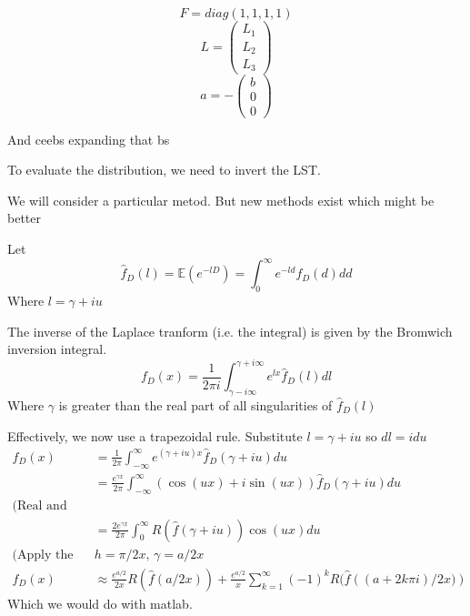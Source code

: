 \documentclass{/home/janmebows/Documents/LatexTemplates/myassignment}
\begin{document}
\[F=diag(1,1,1,1)\]
\[L = \begin{pmatrix}
    L_1\\L_2\\L_3
\end{pmatrix}\]
\[a = - \begin{pmatrix}
    b\\0\\0
\end{pmatrix}\]


And ceebs expanding that bs




To evaluate the distribution, we need to invert the LST.

We will consider a particular metod. But new methods exist which might be better




Let
\[\hat{f}_D (l) = \mathbb{E}\left(e^{-lD}\right) = \int_0^\infty e^{-ld} f_D(d) dd\]
Where $l = \gamma + iu$

The inverse of the Laplace tranform (i.e. the integral) is given by the Bromwich inversion integral.
\[f_D(x) = \frac{1}{2\pi i} \int_{\gamma - i\infty}^{\gamma +i\infty} e^{lx} \hat{f}_D (l) dl\]
Where $\gamma$ is greater than the real part of all singularities of $\hat{f}_D(l)$

Effectively, we now use a trapezoidal rule.
Substitute $l = \gamma + iu$ so $dl = idu$
\begin{align*}
f_D(x) &= \frac{1}{2\pi} \int_{-\infty}^\infty e^{(\gamma + iu)x} \hat{f}_D(\gamma+iu) du\\
&= \frac{e^{\gamma x}}{2\pi} \int_{-\infty}^\infty (\cos(ux) + i\sin(ux)) \hat{f}_D(\gamma + iu) du\\
\text{(Real and nonnegative)}&\\
&=\frac{2e^{\gamma x}}{2\pi} \int_0^\infty R(\hat{f}(\gamma+iu)) \cos(ux) du\\
\text{(Apply the trapezoidal rule w step size )}&h = \pi/2x, \, \gamma = a/2x\\
f_D(x) &\approx \frac{e^{a/2}}{2x} R(\hat{f}(a/2x)) + \frac{e^{a/2}}{x} \sum_{k=1}^\infty (-1)^k R(\hat{f}\left((a+2k\pi i)/2x)\right)
\end{align*}
Which we would do with matlab.
\end{document}
